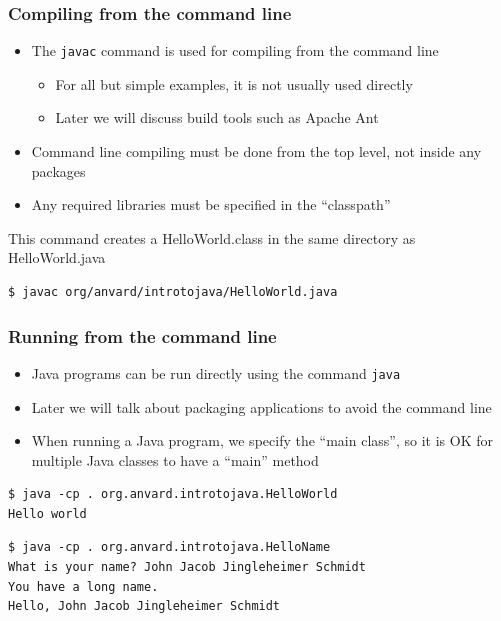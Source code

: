 \documentclass{beamer}
\begin{document}
\begin{frame}[fragile]
\frametitle{Compiling from the command line}
\begin{itemize}
\item The \texttt{javac} command is used for compiling from the command line
\begin{itemize}
\item For all but simple examples, it is not usually used directly
\item Later we will discuss build tools such as Apache Ant
\end{itemize}
\item Command line compiling must be done from the top level, not inside any packages
\item Any required libraries must be specified in the ``classpath''
\end{itemize}
This command creates a HelloWorld.class in the same directory as HelloWorld.java
\lstset{language=}
\begin{lstlisting}
$ javac org/anvard/introtojava/HelloWorld.java
\end{lstlisting}
\end{frame}

\begin{frame}[fragile]
\frametitle{Running from the command line}
\begin{itemize}
\item Java programs can be run directly using the command \texttt{java}
\item Later we will talk about packaging applications to avoid the command line
\item When running a Java program, we specify the ``main class'', so it is OK for multiple Java classes to have a ``main'' method
\end{itemize}
\lstset{language=}
\begin{lstlisting}
$ java -cp . org.anvard.introtojava.HelloWorld
Hello world
\end{lstlisting}
\lstset{language=}
\begin{lstlisting}
$ java -cp . org.anvard.introtojava.HelloName
What is your name? John Jacob Jingleheimer Schmidt
You have a long name.
Hello, John Jacob Jingleheimer Schmidt
\end{lstlisting}
\end{frame}
\end{document}
